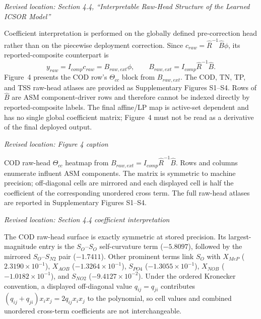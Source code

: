 \documentclass[11pt,a4paper]{article}
\newcommand{\excerptlocation}[1]{\par\noindent\textit{Revised location: #1}\par}
\begin{document}
\excerptlocation{Section 4.4, ``Interpretable Raw-Head Structure of the Learned ICSOR Model''}
\begin{revisionexcerpt}
Coefficient interpretation is performed on the globally defined pre-correction head rather than on the piecewise deployment correction. Since $c_{raw}=\widehat{R}^{-1}\widehat{B}\phi$, its reported-composite counterpart is
\begin{equation*}
y_{raw}=I_{comp}c_{raw}=B_{raw,ext}\phi,
\qquad
B_{raw,ext}=I_{comp}\widehat{R}^{-1}\widehat{B}.
\end{equation*}
Figure~4 presents the COD row's $\Theta_{cc}$ block from $B_{raw,ext}$. The COD, TN, TP, and TSS raw-head atlases are provided as Supplementary Figures S1--S4. Rows of $\widehat{B}$ are ASM component-driver rows and therefore cannot be indexed directly by reported-composite labels. The final affine/LP map is active-set dependent and has no single global coefficient matrix; Figure~4 must not be read as a derivative of the final deployed output.
\end{revisionexcerpt}

\excerptlocation{Figure 4 caption}
\begin{revisionexcerpt}
COD raw-head $\Theta_{cc}$ heatmap from $B_{raw,ext}=I_{comp}\widehat{R}^{-1}\widehat{B}$. Rows and columns enumerate influent ASM components. The matrix is symmetric to machine precision; off-diagonal cells are mirrored and each displayed cell is half the coefficient of the corresponding unordered cross term. The full raw-head atlases are reported in Supplementary Figures S1--S4.
\end{revisionexcerpt}

\excerptlocation{Section 4.4 coefficient interpretation}
\begin{revisionexcerpt}
The COD raw-head surface is exactly symmetric at stored precision. Its largest-magnitude entry is the $S_O$--$S_O$ self-curvature term ($-5.8097$), followed by the mirrored $S_O$--$S_{N2}$ pair ($-1.7411$). Other prominent terms link $S_O$ with $X_{MeP}$ ($2.3190\times10^{-1}$), $X_{AOB}$ ($-1.3264\times10^{-1}$), $S_{PO4}$ ($-1.3055\times10^{-1}$), $X_{NOB}$ ($-1.0182\times10^{-1}$), and $S_{NO2}$ ($-9.4127\times10^{-2}$). Under the ordered Kronecker convention, a displayed off-diagonal value $q_{ij}=q_{ji}$ contributes $(q_{ij}+q_{ji})x_ix_j=2q_{ij}x_ix_j$ to the polynomial, so cell values and combined unordered cross-term coefficients are not interchangeable.
\end{revisionexcerpt}
\end{document}

